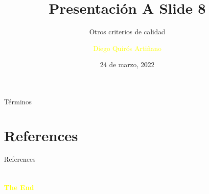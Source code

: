 \documentclass[aspectratio=43, natbib]{beamer}
\title{Presentación A Slide 8} %
\subtitle{Otros criterios de calidad}
\author[D. Quirós Artiñano]{\textcolor{yellow}{Diego Quirós Artiñano}}
\institute[UNA]{
    \textcolor{white}{EIF-203: Estructuras Discretas}%
    \\%
    \textcolor{white}{Universidad Nacional de Costa Rica}%
} %
\date{24 de marzo, 2022}
\begin{document}
    
    \frame{\titlepage}
    
    \begin{frame}{Términos}
        \tableofcontents
    \end{frame}
    
    
    
    
   \section*{References} %
       \begin{frame}{References}
           \printbibliography
       \end{frame}

    \section{}
    \begin{frame}{}
        \centering
            \Huge\bfseries
        \textcolor{yellow}{The End}
    \end{frame}
\end{document}
